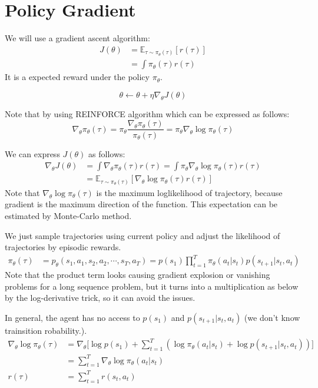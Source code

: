 \chapter{Policy Gradient}
We will use a gradient ascent algorithm:
\begin{align*}
	J(\theta) &=  \mathbb{E}_{\tau\sim \pi_\theta(\tau)}[r(\tau)]\\
	&= \int \pi_\theta(\tau) r(\tau)
\end{align*}
It is a expected reward under the policy $\pi_\theta$.

$$\theta \leftarrow \theta + \eta \nabla_\theta J(\theta)$$

Note that by using REINFORCE algorithm which can be expressed as follows:
$$\nabla_\theta \pi_\theta(\tau) = \pi_\theta \frac{\nabla_\theta \pi_\theta(\tau)}{\pi_\theta(\tau)} = \pi_\theta \nabla_\theta \log \pi_\theta(\tau)$$

We can express $J(\theta)$ as follows:
\begin{align*}
    \nabla_\theta J(\theta) &= \int \nabla_\theta\pi_\theta(\tau) r(\tau) = \int \pi_\theta \nabla_\theta \log \pi_\theta(\tau)r(\tau)\\
	&= \mathbb{E}_{\tau\sim \pi_\theta(\tau)}[\nabla_\theta \log \pi_\theta(\tau)r(\tau)] 
\end{align*}
Note that $\nabla_\theta \log \pi_\theta(\tau)$ is the maximum loglikelihood of trajectory, because gradient is the maximum direction of the function. This expectation can be estimated by Monte-Carlo method. 

We just sample trajectories using current policy and adjust the likelihood of trajectories by episodic rewards. 
\begin{align*}
	\pi_\theta(\tau) &=  p_\theta(s_1,a_1,s_2,a_2,\cdots,s_T,a_T) = p(s_1) \prod_{t=1}^{T}\pi_\theta(a_t|s_t)p(s_{t+1}|s_t,a_t)
\end{align*}
Note that the product term looks causing gradient explosion or vanishing problems for a long sequence problem, but it turns into a multiplication as below by the log-derivative trick, so it can avoid the issues. 

In general, the agent has no access to $p(s_1)$ and $p(s_{t+1}|s_t,a_t)$ (we don't know trainsition robability.).
\begin{align*}
	\nabla_\theta \log \pi_\theta(\tau) &= \nabla_\theta\Bigg[\log p(s_1) + \sum_{t=1}^{T}(\log \pi_\theta(a_t|s_t)+\log p(s_{t+1}|s_t,a_t))\Bigg]\\
	&= \sum_{t=1}^{T}\nabla_\theta\log \pi_\theta(a_t|s_t)\\
	r(\tau) &= \sum_{t=1}^{T}r(s_t,a_t)
\end{align*}

